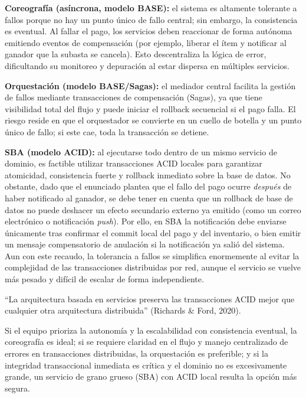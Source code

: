 \documentclass[12pt, a4paper]{article}
\begin{document}
    \textbf{Coreografía (asíncrona, modelo BASE):} el sistema es altamente tolerante a fallos porque no hay un punto único de fallo central; sin embargo, la consistencia es eventual. Al fallar el pago, los servicios deben reaccionar de forma autónoma emitiendo eventos de compensación (por ejemplo, liberar el ítem y notificar al ganador que la subasta se cancela). Esto descentraliza la lógica de error, dificultando su monitoreo y depuración al estar dispersa en múltiples servicios.

    \textbf{Orquestación (modelo BASE/Sagas):} el mediador central facilita la gestión de fallos mediante transacciones de compensación (Sagas), ya que tiene visibilidad total del flujo y puede iniciar el rollback secuencial si el pago falla. El riesgo reside en que el orquestador se convierte en un cuello de botella y un punto único de fallo; si este cae, toda la transacción se detiene.

    \textbf{SBA (modelo ACID):} al ejecutarse todo dentro de un mismo servicio de dominio, es factible utilizar transacciones ACID locales para garantizar atomicidad, consistencia fuerte y rollback inmediato sobre la base de datos. No obstante, dado que el enunciado plantea que el fallo del pago ocurre \textit{después} de haber notificado al ganador, se debe tener en cuenta que un rollback de base de datos no puede deshacer un efecto secundario externo ya emitido (como un correo electrónico o notificación \textit{push}). Por ello, en SBA la notificación debe enviarse únicamente tras confirmar el commit local del pago y del inventario, o bien emitir un mensaje compensatorio de anulación si la notificación ya salió del sistema. Aun con este recaudo, la tolerancia a fallos se simplifica enormemente al evitar la complejidad de las transacciones distribuidas por red, aunque el servicio se vuelve más pesado y difícil de escalar de forma independiente.

    “La arquitectura basada en servicios preserva las transacciones ACID mejor que cualquier otra arquitectura distribuida” (Richards \& Ford, 2020).

    Si el equipo prioriza la autonomía y la escalabilidad con consistencia eventual, la coreografía es ideal; si se requiere claridad en el flujo y manejo centralizado de errores en transacciones distribuidas, la orquestación es preferible; y si la integridad transaccional inmediata es crítica y el dominio no es excesivamente grande, un servicio de grano grueso (SBA) con ACID local resulta la opción más segura.
\end{document}
